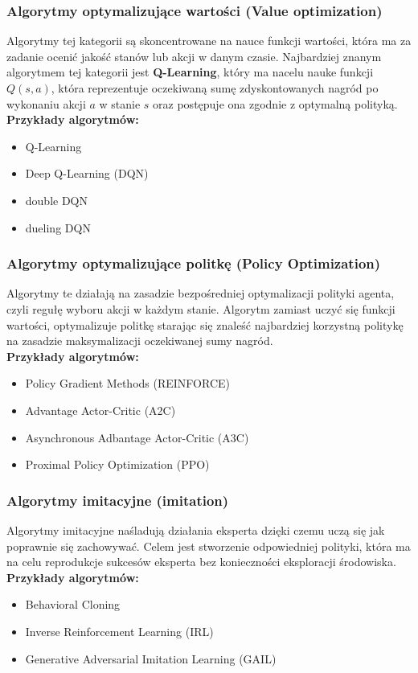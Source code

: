 \documentclass[a4paper, 12pt]{article}
\begin{document}
    \subsubsection{Algorytmy optymalizujące wartości (Value optimization)}
    Algorytmy tej kategorii są skoncentrowane na nauce funkcji wartości, która ma za zadanie ocenić jakość stanów lub akcji w danym czasie.
    Najbardziej znanym algorytmem tej kategorii jest \textbf{Q-Learning}, który ma nacelu nauke funkcji \textbf{\( Q(s,a) \)}, 
    która reprezentuje oczekiwaną sumę zdyskontowanych nagród po wykonaniu akcji \( a \) w stanie \( s \) oraz postępuje ona zgodnie z optymalną polityką.
    \\ \textbf{Przykłady algorytmów:}
    \begin{itemize}
        \item Q-Learning
        \item Deep Q-Learning (DQN)
        \item double DQN
        \item dueling DQN
    \end{itemize}
    \subsubsection{Algorytmy optymalizujące politkę (Policy Optimization)}
    Algorytmy te działają na zasadzie bezpośredniej optymalizacji polityki agenta, czyli regułę wyboru akcji w każdym stanie.
    Algorytm zamiast uczyć się funkcji wartości, optymalizuje politkę starając się znaleść najbardziej korzystną politykę na zasadzie maksymalizacji
    oczekiwanej sumy nagród.
    \\ \textbf{Przykłady algorytmów:}
    \begin{itemize}
        \item Policy Gradient Methods (REINFORCE)
        \item Advantage Actor-Critic (A2C)
        \item Asynchronous Adbantage Actor-Critic (A3C)
        \item Proximal Policy Optimization (PPO)
    \end{itemize}
    \subsubsection{Algorytmy imitacyjne (imitation)}
    Algorytmy imitacyjne naśladują działania eksperta dzięki czemu uczą się jak poprawnie się zachowywać. Celem jest
    stworzenie odpowiedniej polityki, która ma na celu reprodukcje sukcesów eksperta bez konieczności eksploracji środowiska.
    \\ \textbf{Przykłady algorytmów:}
    \begin{itemize}
        \item Behavioral Cloning
        \item Inverse Reinforcement Learning (IRL)
        \item Generative Adversarial Imitation Learning (GAIL)
    \end{itemize}
\end{document}
